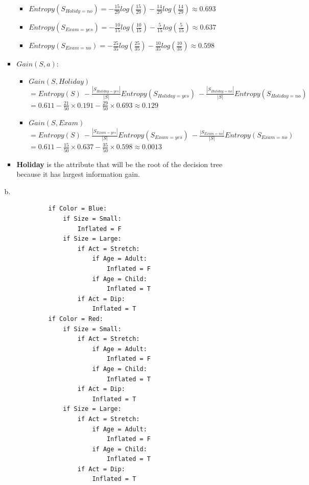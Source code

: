 \begin{enumerate}
\begin{enumerate}
\begin{itemize}
\begin{itemize}
			\item $Entropy(S_{Holidy=no}) = -\frac{15}{29} log(\frac{15}{29}) -\frac{14}{29} log(\frac{14}{29}) \approx 0.693$
			\item $Entropy(S_{Exam=yes}) = -\frac{10}{15} log(\frac{10}{15}) -\frac{5}{15} log(\frac{5}{15}) \approx 0.637$
			\item $Entropy(S_{Exam=no}) = -\frac{25}{35} log(\frac{25}{35}) -\frac{10}{35} log(\frac{10}{35}) \approx 0.598$
			\end{itemize}
		\item $Gain(S,a)$:
			\begin{itemize}
			\item $Gain(S, Holiday) $\\$ = Entropy(S)\ - \frac{|S_{Holiday=yes}|}{|S|} Entropy(S_{Holiday=yes})\ - \frac{|S_{Holiday=no}|}{|S|} Entropy(S_{Holiday=no}) $\\$ = 0.611 - \frac{21}{50} \times 0.191 - \frac{29}{50} \times 0.693 \approx 0.129$
			\item $Gain(S, Exam) $\\$ = Entropy(S)\ - \frac{|S_{Exam=yes}|}{|S|} Entropy(S_{Exam=yes})\ - \frac{|S_{Exam=no}|}{|S|} Entropy(S_{Exam=no}) $\\$ = 0.611 - \frac{15}{50} \times 0.637 - \frac{35}{50} \times 0.598 \approx 0.0013$
			\end{itemize}
		\item \textbf{Holiday} is the attribute that will be the root of the decision tree because it has largest information gain.\\
		\end{itemize}
	\item[b.]
		\begin{verbatim}
			if Color = Blue:
			    if Size = Small:
			        Inflated = F
			    if Size = Large:
			        if Act = Stretch:
			            if Age = Adult:
			                Inflated = F
			            if Age = Child:
			                Inflated = T
			        if Act = Dip:
			            Inflated = T
			if Color = Red:
			    if Size = Small:
			        if Act = Stretch:
			            if Age = Adult:
			                Inflated = F
			            if Age = Child:
			                Inflated = T
			        if Act = Dip:
			            Inflated = T
			    if Size = Large:
			        if Act = Stretch:
			            if Age = Adult:
			                Inflated = F
			            if Age = Child:
			                Inflated = T
			        if Act = Dip:
			            Inflated = T


\end{verbatim}
\end{enumerate}
\end{enumerate}
